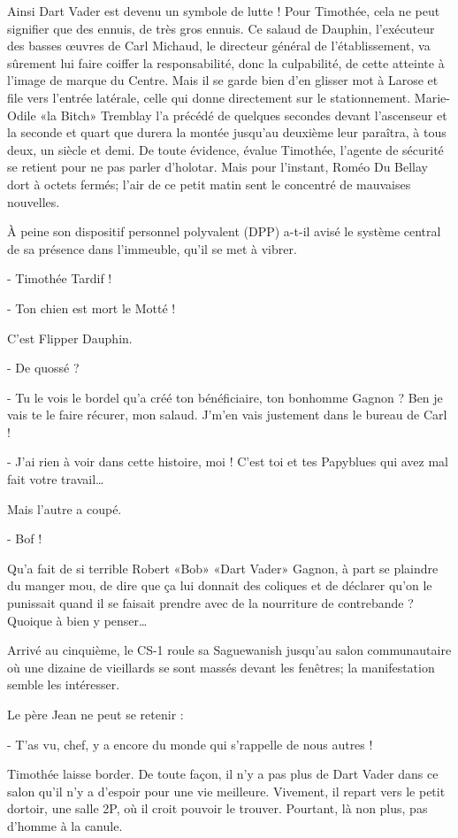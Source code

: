 Ainsi Dart Vader est devenu un symbole de lutte ! Pour Timothée, cela ne peut signifier que des ennuis, de très gros ennuis. Ce salaud de Dauphin, l’exécuteur des basses œuvres de Carl Michaud, le directeur général de l’établissement, va sûrement lui faire coiffer la responsabilité, donc la culpabilité, de cette atteinte à l’image de marque du Centre. Mais il se garde bien d’en glisser mot à Larose et file vers l’entrée latérale, celle qui donne directement sur le stationnement. Marie-Odile «la Bitch» Tremblay l’a précédé de quelques secondes devant l’ascenseur et la seconde et quart que durera la montée jusqu’au deuxième leur paraîtra, à tous deux, un siècle et demi. De toute évidence, évalue Timothée, l’agente de sécurité se retient pour ne pas parler d’holotar. Mais pour l’instant, Roméo Du Bellay dort à octets fermés; l’air de ce petit matin sent le concentré de mauvaises nouvelles.

À peine son dispositif personnel polyvalent (DPP) a-t-il avisé le système central de sa présence dans l’immeuble, qu’il se met à vibrer.

- Timothée Tardif !

- Ton chien est mort le Motté !

C’est Flipper Dauphin.

- De quossé ?

- Tu le vois le bordel qu’a créé ton bénéficiaire, ton bonhomme Gagnon ? Ben je vais te le faire récurer, mon salaud. J’m’en vais justement dans le bureau de Carl !

- J’ai rien à voir dans cette histoire, moi ! C’est toi et tes Papyblues qui avez mal fait votre travail…

Mais l’autre a coupé.

- Bof !

Qu’a fait de si terrible Robert «Bob» «Dart Vader» Gagnon, à part se plaindre du manger mou, de dire que ça lui donnait des coliques et de déclarer qu’on le punissait quand il se faisait prendre avec de la nourriture de contrebande ? Quoique à bien y penser…

Arrivé au cinquième, le CS-1 roule sa Saguewanish jusqu’au salon communautaire où une dizaine de vieillards se sont massés devant les fenêtres; la manifestation semble les intéresser.

Le père Jean ne peut se retenir :

- T’as vu, chef, y a encore du monde qui s’rappelle de nous autres !

Timothée laisse border. De toute façon, il n’y a pas plus de Dart Vader dans ce salon qu’il n’y a d’espoir pour une vie meilleure. Vivement, il repart vers le petit dortoir, une salle 2P, où il croit pouvoir le trouver. Pourtant, là non plus, pas d’homme à la canule.

